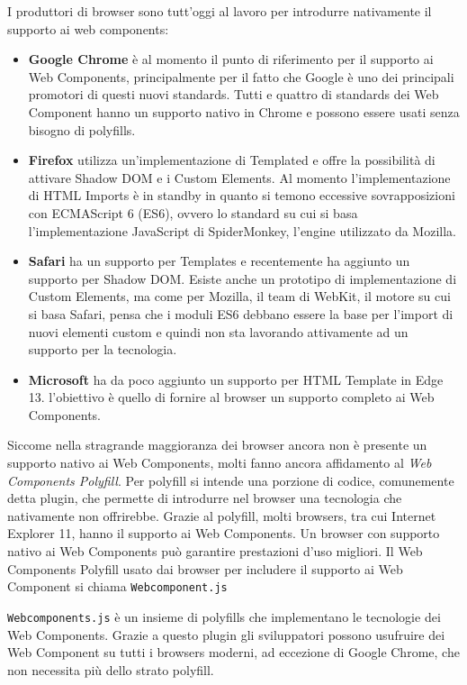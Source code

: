 I produttori di browser sono tutt’oggi al lavoro per introdurre nativamente il supporto ai web components:
\begin{itemize}
\item \textbf{Google Chrome} è al momento il punto di riferimento per il supporto ai Web Components, principalmente per il fatto che Google è uno dei principali promotori di questi nuovi standards. Tutti e quattro di standards dei Web Component hanno un supporto nativo in Chrome e possono essere usati senza bisogno di polyfills. 
\item \textbf{Firefox} utilizza un’implementazione di Templated e offre la possibilità di attivare Shadow DOM e i Custom Elements. Al momento l’implementazione di HTML Imports è in standby in quanto si temono eccessive sovrapposizioni con ECMAScript 6 (ES6), ovvero lo standard su cui si basa l’implementazione JavaScript di SpiderMonkey, l’engine utilizzato da Mozilla. 
\item \textbf{Safari} ha un supporto per Templates e recentemente ha aggiunto un supporto per Shadow DOM. Esiste anche un prototipo di implementazione di Custom Elements, ma come per Mozilla, il team di WebKit, il motore su cui si basa Safari, pensa che i moduli ES6 debbano essere la base per l’import di nuovi elementi custom e quindi non sta lavorando attivamente ad un supporto per la tecnologia.
\item \textbf{Microsoft} ha da poco aggiunto un supporto per HTML Template in Edge 13. l’obiettivo è quello di fornire al browser un supporto completo ai Web Components.
\end{itemize}

Siccome nella stragrande maggioranza dei browser ancora non è presente un supporto nativo ai Web Components, molti fanno ancora affidamento al \emph{Web Components Polyfill}.
Per polyfill si intende una porzione di codice, comunemente detta plugin, che permette di introdurre nel browser una tecnologia che nativamente non offrirebbe. 
Grazie al polyfill, molti browsers, tra cui Internet Explorer 11, hanno il supporto ai Web Components. 
Un browser con supporto nativo ai Web Components può garantire prestazioni d’uso migliori. Il Web Components Polyfill usato dai browser per includere il supporto ai Web Component si chiama \texttt{Webcomponent.js}

\texttt{Webcomponents.js} è un insieme di polyfills che implementano le tecnologie dei Web Components. Grazie a questo plugin gli sviluppatori possono usufruire dei Web Component su tutti i browsers moderni, ad eccezione di Google Chrome, che non necessita più dello strato polyfill.

